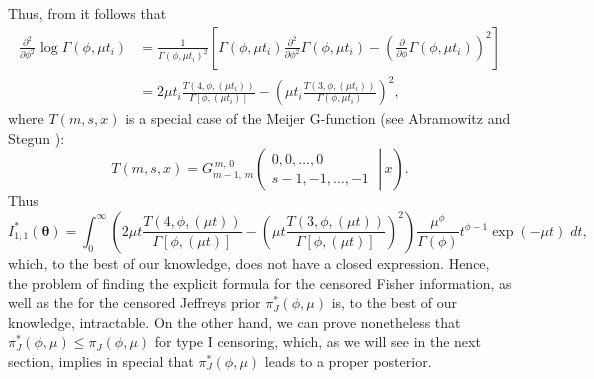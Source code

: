 \documentclass[]{interact}
\theoremstyle{plain}%
\theoremstyle{definition}
\theoremstyle{remark}
\begin{document}
Thus, from \cite{1990-Geddes} it follows that
    \begin{equation*}
    \begin{aligned}
    \frac{\partial^2}{\partial \phi ^2} \log \Gamma(\phi,\mu t_i) &= \frac{1}{\Gamma(\phi,\mu t_i)^2}\left[\Gamma(\phi,\mu t_i)\frac{\partial^2}{\partial \phi ^2}\Gamma(\phi,\mu t_i) - \left(\frac{\partial}{\partial \phi}\Gamma(\phi,\mu t_i)\right)^2\right]\\
    &=2\mu t_i \frac{T(4,\phi,(\mu t_i))}{\Gamma\left[\phi,(\mu t_i)\right]}-\left(\mu t_i\frac{T(3,\phi,(\mu t_i))}{\Gamma(\phi,\mu t_i)}\right)^2,
    \end{aligned}
\end{equation*}
where $T(m,s,x)$ is a special case of the Meijer G-function (see Abramowitz and Stegun \cite{abramowitz}):
\begin{equation*} 
T(m,s,x) = G_{m-1,\,m}^{\,m,\,0}\!\left(\left.{\begin{matrix}0,0,\dots ,0\\s-1,-1,\dots ,-1\end{matrix}}\;\right|\,x\right).
\end{equation*}
Thus
\begin{equation*} I_{1,1}^*(\boldsymbol{\theta}) = \int_0^\infty \left(2\mu t \frac{T(4,\phi,(\mu t))}{\Gamma\left[\phi,(\mu t)\right]}-\left(\mu t\frac{T(3,\phi,(\mu t))}{\Gamma[\phi,(\mu t)]}\right)^2\right)\frac{\mu^\phi}{\Gamma(\phi)}t^{\phi-1}\exp(-\mu t)\; dt,
\end{equation*}
which, to the best of our knowledge,  does not have a closed expression. Hence, the problem of finding the explicit formula for the censored Fisher information, as well as the for the censored Jeffreys prior $\pi_J^*\left(\phi,\mu\right)$ is, to the best of our knowledge, intractable. On the other hand, we can prove nonetheless that $\pi_J^*\left(\phi,\mu\right)\leq \pi_J(\phi,\mu)$ for type I censoring, which, as we will see in the next section, implies in special that $\pi_J^*(\phi,\mu)$ leads to a proper posterior.
\end{document}
